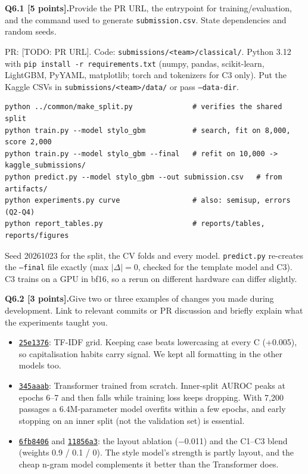 \documentclass[11pt,letterpaper]{article}
\newcommand{\question}[2]{\needspace{4\baselineskip}\par\addvspace{0.45em}\noindent\textbf{#1}\quad #2\par\nobreak\vspace{0.1em}}
\newcommand{\commit}[2]{\href{https://github.com/ZhenmanShen/human-or-ai-submissions/commit/#1}{\texttt{#2}}}
\begin{document}
\question{Q6.1 [5 points].}{Provide the PR URL, the entrypoint for training/evaluation, and the command used to generate \texttt{submission.csv}. State dependencies and random seeds.}
PR: [TODO: PR URL]. Code: \texttt{submissions/<team>/classical/}. Python 3.12 with \texttt{pip install -r requirements.txt} (numpy, pandas, scikit-learn, LightGBM, PyYAML, matplotlib; torch and tokenizers for C3 only). Put the Kaggle CSVs in \texttt{submissions/<team>/data/} or pass \texttt{--data-dir}.
{\footnotesize\begin{verbatim}
python ../common/make_split.py              # verifies the shared split
python train.py --model stylo_gbm           # search, fit on 8,000, score 2,000
python train.py --model stylo_gbm --final   # refit on 10,000 -> kaggle_submissions/
python predict.py --model stylo_gbm --out submission.csv   # from artifacts/
python experiments.py curve                 # also: semisup, errors (Q2-Q4)
python report_tables.py                     # reports/tables, reports/figures
\end{verbatim}}
{\raggedright Seed 20261023 for the split, the CV folds and every model. \texttt{predict.py} re-creates the \texttt{--final} file exactly (max $|\Delta| = 0$, checked for the template model and C3). C3 trains on a GPU in bf16, so a rerun on different hardware can differ slightly.\par}

\question{Q6.2 [3 points].}{Give two or three examples of changes you made during development. Link to relevant commits or PR discussion and briefly explain what the experiments taught you.}
\begin{itemize}
\item \commit{25e13767d61438179159ac80483685b2ae4cf0ce}{25e1376}: TF-IDF grid. Keeping case beats lowercasing at every C (+0.005), so capitalisation habits carry signal. We kept all formatting in the other models too.
\item \commit{345aaab6ff162b0dd75461b219afda13866aed63}{345aaab}: Transformer trained from scratch. Inner-split AUROC peaks at epochs 6--7 and then falls while training loss keeps dropping. With 7,200 passages a 6.4M-parameter model overfits within a few epochs, and early stopping on an inner split (not the validation set) is essential.
\item \commit{6fb8406709d375571d760b4d23b11a131c61c44e}{6fb8406} and \commit{11856a37a75eab0f610fdfb2d9ddff0ae7bbefab}{11856a3}: the layout ablation ($-$0.011) and the C1--C3 blend (weights 0.9 / 0.1 / 0). The style model's strength is partly layout, and the cheap n-gram model complements it better than the Transformer does.
\end{itemize}
\end{document}
